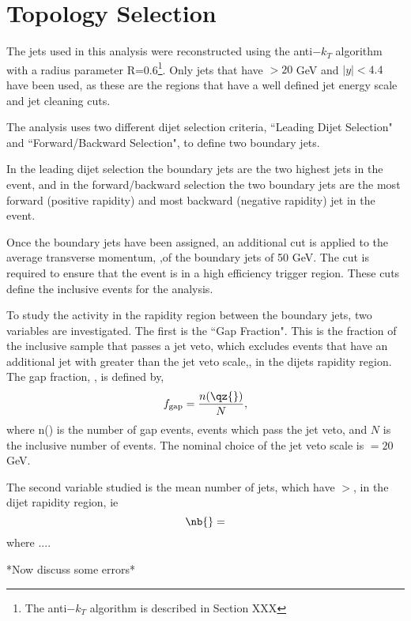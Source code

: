 \section{Topology Selection}
\label{sec:GBJ1:AnalSel}
The jets used in this analysis were reconstructed using the anti$-k_T$ algorithm with a radius parameter R=0.6\footnote{The anti$-k_T$ algorithm is described in Section XXX}. 
Only jets that have \pt{}$>20$ GeV and $|y|<4.4$ have been used, as these are the regions that have a well defined jet energy scale and jet cleaning cuts. 


The analysis uses two different dijet selection criteria, ``Leading \pt{} Dijet Selection" and ``Forward/Backward Selection", to define two boundary jets. 

In the leading dijet \pt{} selection the boundary jets are the two highest \pt{} jets in the event, and in the forward/backward selection the two boundary jets are the most forward (positive rapidity) and most backward (negative rapidity) jet in the event. 



Once the boundary jets have been assigned, an additional cut is applied to the average transverse momentum, \ptb{},of the boundary jets of 50 GeV. 
The \ptb{} cut is required to ensure that the event is in a high efficiency trigger region. 
These cuts define the inclusive events for the analysis. 


To study the activity in the rapidity region between the boundary jets, two variables are investigated. 
The first is the ``Gap Fraction". This is the fraction of the inclusive sample  that passes a jet veto, which excludes events that have an additional jet with \pt{} greater than the jet veto scale,\qz{}, in the dijets rapidity region. 
The gap fraction, \gap, is defined by,
\begin{equation}
f_{\rm gap} = \frac{n (\qz{})}{N},
\label{GBJ1:fgap}
\end{equation}
where n(\qz{}) is the number of gap events, events which pass the jet veto, and $N$ is the inclusive number of events.
The nominal choice of the jet veto scale is \qz{}$=20$ GeV. 

The second variable studied is the mean number of jets, which have \pt{}$>$\qz{}, in the dijet rapidity region, ie 
\begin{equation}
\nb{} = 
\label{GBJ1:fgap}
\end{equation}
where ....

*Now discuss some errors*
